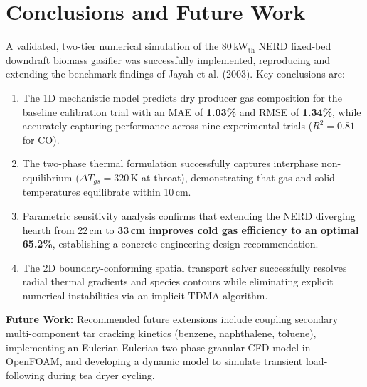 \documentclass[11pt,a4paper]{article}
\begin{document}
\section{Conclusions and Future Work}
A validated, two-tier numerical simulation of the 80\,kW$_{\text{th}}$ NERD fixed-bed downdraft biomass gasifier was successfully implemented, reproducing and extending the benchmark findings of Jayah et al. (2003). Key conclusions are:
\begin{enumerate}[leftmargin=1.5em]
    \item The 1D mechanistic model predicts dry producer gas composition for the baseline calibration trial with an MAE of \textbf{1.03\%} and RMSE of \textbf{1.34\%}, while accurately capturing performance across nine experimental trials ($R^2 = 0.81$ for CO).
    \item The two-phase thermal formulation successfully captures interphase non-equilibrium ($\Delta T_{gs} = 320$\,K at throat), demonstrating that gas and solid temperatures equilibrate within 10\,cm.
    \item Parametric sensitivity analysis confirms that extending the NERD diverging hearth from 22\,cm to \textbf{33\,cm improves cold gas efficiency to an optimal 65.2\%}, establishing a concrete engineering design recommendation.
    \item The 2D boundary-conforming spatial transport solver successfully resolves radial thermal gradients and species contours while eliminating explicit numerical instabilities via an implicit TDMA algorithm.
\end{enumerate}

\textbf{Future Work:} Recommended future extensions include coupling secondary multi-component tar cracking kinetics (benzene, naphthalene, toluene), implementing an Eulerian-Eulerian two-phase granular CFD model in OpenFOAM, and developing a dynamic model to simulate transient load-following during tea dryer cycling.
\end{document}
